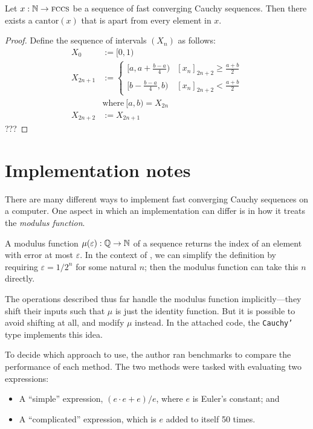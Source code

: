 \documentclass[leqno]{report}
\begin{document}
\begin{Proposition}
    Let $x : \mathbb{N} \rightarrow \textsc{fccs}$ be a sequence of fast converging Cauchy sequences. Then there exists a \FCCS{} $\mathrm{cantor}(x)$ that is apart from every element in $x$.
\end{Proposition}

\begin{proof}
    Define the sequence of intervals $(X_n)$ as follows:
    \begin{align*}
        X_0 &:= [0, 1) \\
        X_{2n+1} &:= \begin{cases}
            [a, a + \frac{b - a}{4}) & [x_n]_{2n+2} \geq \frac{a + b}{2} \\
            [b - \frac{b - a}{4}, b) & [x_n]_{2n+2} < \frac{a + b}{2}
        \end{cases} \\
        & \mathrm{where}\ [a, b) = X_{2n} \\
        X_{2n+2} &:= X_{2n+1}
    \end{align*}
    ???
\end{proof}

\chapter{Implementation notes}

There are many different ways to implement fast converging Cauchy sequences on a computer. One aspect in which an implementation can differ is in how it treats the \textit{modulus function}.

A modulus function $\mu(\varepsilon) : \mathbb{Q} \rightarrow \mathbb{N}$ of a sequence returns the index of an element with error at most $\varepsilon$. In the context of \FCCS, we can simplify the definition by requiring $\varepsilon = 1/2^n$ for some natural $n$; then the modulus function can take this $n$ directly.

The \FCCS{} operations described thus far handle the modulus function implicitly---they shift their inputs such that $\mu$ is just the identity function. But it is possible to avoid shifting at all, and modify $\mu$ instead. In the attached code, the \texttt{Cauchy'} type implements this idea.

To decide which approach to use, the author ran benchmarks to compare the performance of each method. The two methods were tasked with evaluating two expressions:
\begin{itemize}
    \item A ``simple'' expression, $(e \cdot e + e) / e$, where $e$ is Euler's constant; and
    \item A ``complicated'' expression, which is $e$ added to itself 50 times.
\end{itemize}
\end{document}
